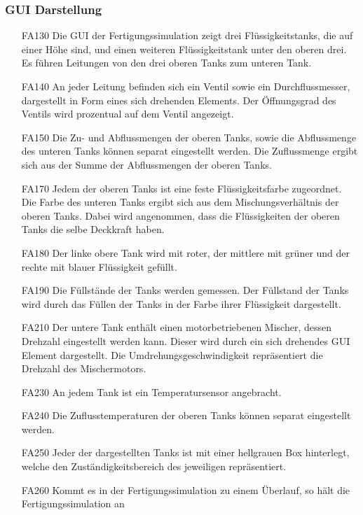 \documentclass[parskip=full]{scrartcl}
\begin{document}
\subsubsection{GUI Darstellung}
\begin{enumerate}
  \item[FA130] Die \gls{GUI} der \gls{Fertigungssimulation} zeigt drei Flüssigkeitstanks, die auf einer Höhe sind, und einen weiteren Flüssigkeitstank unter den oberen drei.
    Es führen Leitungen von den drei oberen Tanks zum unteren Tank.
  \item[FA140] An jeder Leitung befinden sich ein Ventil sowie ein Durchflussmesser, dargestellt in Form eines sich drehenden Elements. Der Öffnungsgrad des Ventils wird prozentual auf dem Ventil angezeigt.
  \item[FA150] Die Zu- und Abflussmengen der oberen Tanks, sowie die Abflussmenge des unteren Tanks können separat eingestellt werden. Die Zuflussmenge ergibt sich aus der Summe der Abflussmengen der oberen Tanks.
  \item[FA170] Jedem der oberen Tanks ist eine feste Flüssigkeitsfarbe zugeordnet. Die Farbe des unteren Tanks ergibt sich aus dem Mischungsverhältnis der oberen Tanks. Dabei wird
	angenommen, dass die Flüssigkeiten der oberen Tanks die selbe Deckkraft haben.
  \item[FA180] Der linke obere Tank wird mit roter, der mittlere mit grüner und der rechte mit blauer Flüssigkeit gefüllt.
  \item[FA190] Die Füllstände der Tanks werden gemessen. Der Füllstand der Tanks wird durch das Füllen der Tanks in der Farbe ihrer Flüssigkeit dargestellt.
  \item[FA210] Der untere Tank enthält einen motorbetriebenen Mischer, dessen Drehzahl eingestellt werden kann. Dieser wird durch ein sich drehendes \gls{GUI} Element dargestellt.
    Die Umdrehungsgeschwindigkeit repräsentiert die Drehzahl des Mischermotors.
  \item[FA230] An jedem Tank ist ein Temperatursensor angebracht.
  \item[FA240] Die Zuflusstemperaturen der oberen Tanks können separat eingestellt werden.
  \item[FA250] Jeder der dargestellten Tanks ist mit einer hellgrauen Box hinterlegt, welche den Zuständigkeitsbereich des jeweiligen  repräsentiert.
  \item[FA260] Kommt es in der \gls{Fertigungssimulation} zu einem \"Uberlauf, so h\"alt die \gls{Fertigungssimulation} an

\end{enumerate}
\end{document}
